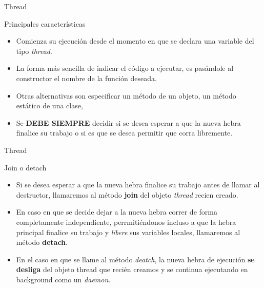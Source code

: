 \begin{frame}{Thread}
\begin{block}{Principales características}
\begin{itemize}
  \item Comienza su ejecución desde el momento en que se declara una variable del tipo \textit{thread}.
  \item La forma más sencilla de indicar el código a ejecutar, es pasándole al constructor el nombre de la función deseada.
  \item Otras alternativas son especificar un método de un objeto, un método estático de una clase, 
  \item Se \textbf{DEBE SIEMPRE} decidir si se desea esperar a que la nueva hebra finalice su trabajo o si es que se desea permitir que corra libremente.
\end{itemize}
\end{block}
\end{frame}

\begin{frame}{Thread}
\begin{block}{Join o detach}
\begin{itemize}
  \item Si se desea esperar a que la nueva hebra finalice su trabajo antes de llamar al destructor, llamaremos al método \textbf{join} del objeto \textit{thread} recien creado.
  \item En caso en que se decide dejar a la nueva hebra correr de forma completamente independiente, perrmitiéndonos incluso a que la hebra principal finalice su trabajo y \textit{libere} sus variables locales, llamaremos al método \textbf{detach}.
\end{itemize}
\begin{itemize}
  \item En el caso en que se llame al método \textit{deatch}, la nueva hebra de ejecución \textbf{se desliga} del objeto thread que recién creamos y se continua ejecutando en background como un \textit{daemon}.
\end{itemize}
\end{block}
\end{frame}

